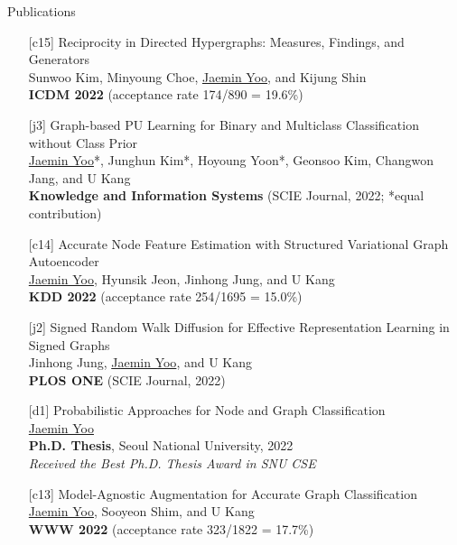 \documentclass{resume} %
\begin{document}
\begin{rSection}{Publications}
\smallskip
\begin{enumerate}[leftmargin=*]

	\item[{[c15]}]
		Reciprocity in Directed Hypergraphs: Measures, Findings, and Generators \\
		Sunwoo Kim, Minyoung Choe, \underline{Jaemin Yoo}, and Kijung Shin \\
		\textbf{ICDM 2022} (acceptance rate 174/890 = 19.6\%) \\

	\item[{[j3]}]
		Graph-based PU Learning for Binary and Multiclass Classification without Class Prior \\
		\underline{Jaemin Yoo}*, Junghun Kim*, Hoyoung Yoon*, Geonsoo Kim, Changwon Jang, and U Kang \\
		\textbf{Knowledge and Information Systems} (SCIE Journal, 2022; *equal contribution) \\

	\item[{[c14]}]
		Accurate Node Feature Estimation with Structured Variational Graph Autoencoder \\
		\underline{Jaemin Yoo}, Hyunsik Jeon, Jinhong Jung, and U Kang \\
		\textbf{KDD 2022} (acceptance rate 254/1695 = 15.0\%) \\

	\item[{[j2]}]
		Signed Random Walk Diffusion for Effective Representation Learning in Signed Graphs \\
		Jinhong Jung, \underline{Jaemin Yoo}, and U Kang \\
		\textbf{PLOS ONE} (SCIE Journal, 2022)

	\item[{[d1]}]
		Probabilistic Approaches for Node and Graph Classification \\
		\underline{Jaemin Yoo} \\
		\textbf{Ph.D. Thesis}, Seoul National University, 2022 \\
		\emph{Received the Best Ph.D. Thesis Award in SNU CSE}

	\item[{[c13]}]
		Model-Agnostic Augmentation for Accurate Graph Classification \\
		\underline{Jaemin Yoo}, Sooyeon Shim, and U Kang \\
		\textbf{WWW 2022} (acceptance rate 323/1822 = 17.7\%) \\


\end{enumerate}
\end{rSection}
\end{document}
